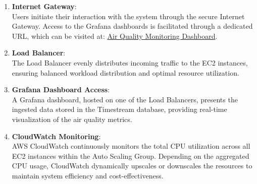 \documentclass[12pt,oneside]{book} %
\begin{document}
\begin{enumerate}
    \item \textbf{Internet Gateway}: \\
    Users initiate their interaction with the system through the secure Internet Gateway. Access to the Grafana dashboards is facilitated through a dedicated URL, which can be visited at: \href{http://grafana-1777174802.us-east-1.elb.amazonaws.com/d/f8742187-f440-4ee8-96cc-bad5af8edef1/air-quality-monitoring}{Air Quality Monitoring Dashboard}.

    \item \textbf{Load Balancer}: \\
    The Load Balancer evenly distributes incoming traffic to the EC2 instances, ensuring balanced workload distribution and optimal resource utilization.

    \item \textbf{Grafana Dashboard Access}: \\
    A Grafana dashboard, hosted on one of the Load Balancers, presents the ingested data stored in the Timestream database, providing real-time visualization of the air quality metrics.

    \item \textbf{CloudWatch Monitoring}: \\
    AWS CloudWatch continuously monitors the total CPU utilization across all EC2 instances within the Auto Scaling Group. Depending on the aggregated CPU usage, CloudWatch dynamically upscales or downscales the resources to maintain system efficiency and cost-effectiveness.
\end{enumerate}
\end{document}
